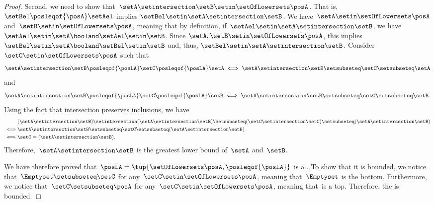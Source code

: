 \begin{proof}
    Second, we need to show that~$\setA \setintersection \setB\setin \setOfLowersets \posA$.
    That is, $\setBel \posleqof{\posA} \setAel$ implies $\setBel \setin \setA\setintersection \setB$.
    We have~$\setA \setin \setOfLowersets \posA$ and~$\setB\setin \setOfLowersets \posA$, meaning that by definition, if~$\setAel\setin \setA\setintersection \setB$, we have~$\setAel \setin \setA\booland \setAel\setin \setB$.
    Since $\setA,\setB \setin \setOfLowersets\posA$, this implies $\setBel \setin \setA\booland \setBel\setin \setB$ and, thus, $\setBel \setin \setA\setintersection\setB$.
    Consider~$\setC\setin \setOfLowersets \posA$ such that
    \[
        \setA\setintersection \setB\posleqof{\posLA} \setC\posleqof{\posLA} \setA
        \iff
        \setA\setintersection \setB\setsubseteq \setC\setsubseteq \setA
    \]
    and
    \[
        \setA\setintersection \setB\posleqof{\posLA} \setC\posleqof{\posLA} \setB
        \iff
        \setA\setintersection \setB\setsubseteq \setC\setsubseteq \setB.
    \]
    Using the fact that intersection preserves inclusions, we have
    \begin{equation}
        \begin{aligned}
                 & (\setA\setintersection \setB)
            \setintersection (\setA\setintersection \setB)  \setsubseteq (\setC \setintersection \setC) \setsubseteq (\setA\setintersection \setB) \\
            \iff & \setA\setintersection \setB                    \setsubseteq \setC\setsubseteq (\setA\setintersection \setB) \\
            \iff & \setC                                           =(\setA\setintersection \setB).
        \end{aligned}
    \end{equation}
    Therefore,~$\setA\setintersection \setB$ is the greatest lower bound of~$\setA$ and~$\setB$.

    We have therefore proved that~$\posLA=\tup{\setOfLowersets \posA, \posleqof{\posLA}}$ is a .
    To show that it is bounded, we notice that~$\Emptyset \setsubseteq \setC$ for any~$\setC\setin \setOfLowersets \posA$, meaning that~$\Emptyset$ is the bottom.
    Furthermore, we notice that~$\setC\setsubseteq \posA$ for any~$\setC\setin \setOfLowersets \posA$, meaning that~\posA is a top.
    Therefore, the  is bounded.
\end{proof}

\vfill

